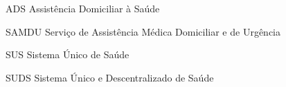 \begin{siglas}
  \item[ADS] Assistência Domiciliar à Saúde 
  \item[SAMDU] Serviço de Assistência Médica Domiciliar e de Urgência 
  \item[SUS] Sistema Único de Saúde 
  \item[SUDS] Sistema Único e Descentralizado de Saúde 
\end{siglas}